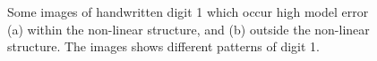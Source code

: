 \documentclass[
  12pt]{article}
\begin{document}
\begin{figure}[H]

\begin{minipage}{0.50\linewidth}


\subcaption{\label{fig-mnist1-within}}

\end{minipage}%
%
\begin{minipage}{0.50\linewidth}


\subcaption{\label{fig-mnist1-out}}

\end{minipage}%

\caption{\label{fig-mnist-anomalies}Some images of handwritten digit 1
which occur high model error (a) within the non-linear structure, and
(b) outside the non-linear structure. The images shows different
patterns of digit 1.}

\end{figure}%
\end{document}
